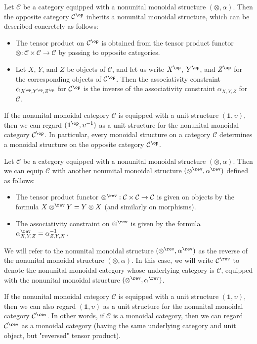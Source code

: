 \begin{example}\label{monoidal cat induced on opposite}
Let $\mathcal{C}$ be a category equipped with a nonunital monoidal structure $(\otimes,\alpha)$. Then the opposite category $\mathcal{C}^{\op}$ inherits a nonunital monoidal structure, which can be described concretely as follows:
\begin{itemize}
\item The tensor product on $\mathcal{C}^{\op}$ is obtained from the tensor product functor $\otimes:\mathcal{C}\times\mathcal{C}\to\mathcal{C}$ by passing to opposite categories.
\item Let $X$, $Y$, and $Z$ be objects of $\mathcal{C}$, and let us write $X^{\op}$, $Y^{\op}$, and $Z^{\op}$ for the corresponding objects of $\mathcal{C}^{\op}$. Then the associativity constraint $\alpha_{X^{\op},Y^{\op},Z^{\op}}$ for $\mathcal{C}^{\op}$ is the inverse of the associativity constraint $\alpha_{X,Y,Z}$ for $\mathcal{C}$.
\end{itemize}
If the nonunital monoidal category $\mathcal{C}$ is equipped with a unit structure $(\mathbf{1},\upsilon)$, then we can regard $(\mathbf{1}^{\op},\upsilon^{-1})$ as a unit structure for the nonunital monoidal category $\mathcal{C}^{\op}$. In particular, every monoidal structure on a category $\mathcal{C}$ determines a monoidal structure on the opposite category $\mathcal{C}^{\op}$.
\end{example}
\begin{example}\label{monoidal cat induced on reverse}
Let $\mathcal{C}$ be a category equipped with a nonunital monoidal structure $(\otimes,\alpha)$. Then we can equip $\mathcal{C}$ with another nonunital monoidal structure $(\otimes^{\rev},\alpha^{\rev})$ defined as follows:
\begin{itemize}
\item The tensor product functor $\otimes^{\rev}:\mathcal{C}\times\mathcal{C}\to\mathcal{C}$ is given on objects by the formula $X\otimes^{\rev}Y=Y\otimes X$ (and similarly on morphisms).
\item The associativity constraint on $\otimes^{\rev}$ is given by the formula $\alpha^{\rev}_{X,Y,Z}=\alpha_{Z,Y,X}^{-1}$.
\end{itemize}
We will refer to the nonunital monoidal structure $(\otimes^{\rev},\alpha^{\rev})$ as the reverse of the nonunital monoidal structure $(\otimes,\alpha)$. In this case, we will write $\mathcal{C}^{\rev}$ to denote the nonunital monoidal category whose underlying category is $\mathcal{C}$, equipped with the nonunital monoidal structure $(\otimes^{\rev},\alpha^{\rev})$.\par
If the nonunital monoidal category $\mathcal{C}$ is equipped with a unit structure $(\mathbf{1},\upsilon)$, then we can also regard $(\mathbf{1},\upsilon)$ as a unit structure for the nonunital monoidal category $\mathcal{C}^{\rev}$. In other words, if $\mathcal{C}$ is a monoidal category, then we can regard $\mathcal{C}^{\rev}$ as a monoidal category (having the same underlying category and unit object, but "reversed" tensor product).
\end{example}
